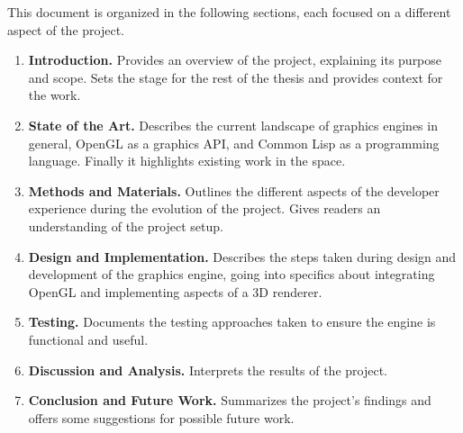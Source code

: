 This document is organized in the following sections, each focused on a different aspect of the project.

\begin{enumerate}
  \item \textbf{Introduction.} Provides an overview of the project, explaining its purpose and scope. Sets the stage for the rest of the thesis and provides context for the work.
  \item \textbf{State of the Art.} Describes the current landscape of graphics engines in general, OpenGL as a graphics API, and Common Lisp as a programming language. Finally it highlights existing work in the space.
  \item \textbf{Methods and Materials.} Outlines the different aspects of the developer experience during the evolution of the project. Gives readers an understanding of the project setup.
  \item \textbf{Design and Implementation.} Describes the steps taken during design and development of the graphics engine, going into specifics about integrating OpenGL and implementing aspects of a 3D renderer.
  \item \textbf{Testing.} Documents the testing approaches taken to ensure the engine is functional and useful.
  \item \textbf{Discussion and Analysis.} Interprets the results of the project.
  \item \textbf{Conclusion and Future Work.} Summarizes the project's findings and offers some suggestions for possible future work.
\end{enumerate}
